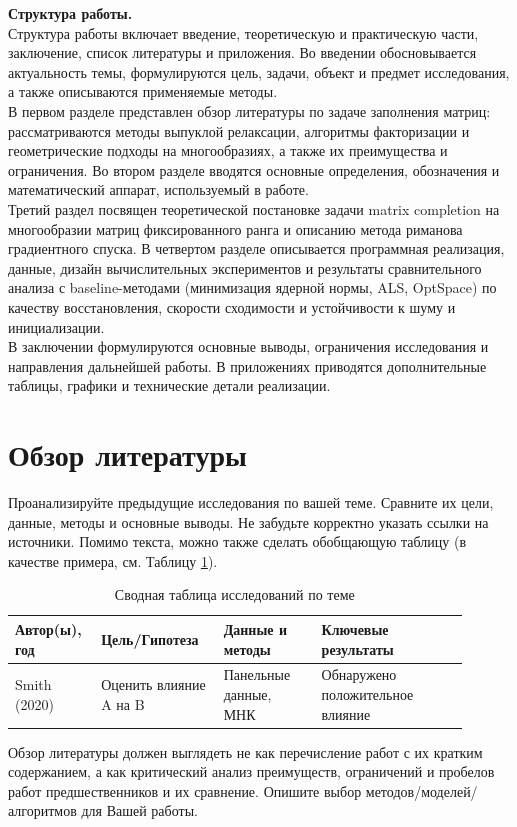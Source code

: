 \documentclass[a4paper,12pt]{article}
\begin{document}
\textbf{Структура работы.} \\[5pt]
Структура работы включает введение, теоретическую и практическую части, заключение, список литературы и приложения. Во введении обосновывается актуальность темы, формулируются цель, задачи, объект и предмет исследования, а также описываются применяемые методы. \\[5pt]
В первом разделе представлен обзор литературы по задаче заполнения матриц: рассматриваются методы выпуклой релаксации, алгоритмы факторизации и геометрические подходы на многообразиях, а также их преимущества и ограничения. Во втором разделе вводятся основные определения, обозначения и математический аппарат, используемый в работе. \\[5pt]
Третий раздел посвящен теоретической постановке задачи matrix completion на многообразии матриц фиксированного ранга и описанию метода риманова градиентного спуска. В четвертом разделе описывается программная реализация, данные, дизайн вычислительных экспериментов и результаты сравнительного анализа с baseline-методами (минимизация ядерной нормы, ALS, OptSpace) по качеству восстановления, скорости сходимости и устойчивости к шуму и инициализации. \\[25pt]
В заключении формулируются основные выводы, ограничения исследования и направления дальнейшей работы. В приложениях приводятся дополнительные таблицы, графики и технические детали реализации.

\newpage

\section{Обзор литературы}
\label{sec:literature}




Проанализируйте предыдущие исследования по вашей теме. Сравните их цели, данные, методы и основные выводы. Не забудьте корректно указать ссылки на источники. Помимо текста, можно также сделать обобщающую таблицу (в качестве примера, см. Таблицу \ref{tab:literature}).
\begin{table}[H]
    \centering
    \caption{Сводная таблица исследований по теме}
    \label{tab:literature}
    \begin{tabular}{p{0.15\linewidth}p{0.25\linewidth}p{0.2\linewidth}p{0.3\linewidth}}
        \toprule
        \textbf{Автор(ы), год}        & \textbf{Цель/Гипотеза} & \textbf{Данные и методы} & \textbf{Ключевые результаты}     \\
        \midrule
        Smith (2020) \cite{smith2020} & Оценить влияние A на B & Панельные данные, МНК    & Обнаружено положительное влияние \\
        \bottomrule
    \end{tabular}
\end{table}
Обзор литературы должен выглядеть не как перечисление работ с их кратким содержанием, а как критический анализ преимуществ, ограничений и пробелов работ предшественников и их сравнение. Опишите выбор методов/моделей/алгоритмов для Вашей работы.
\end{document}
